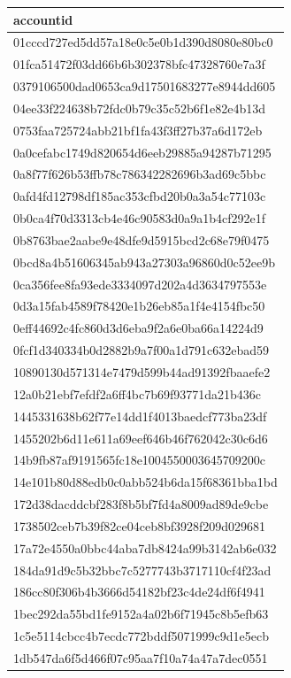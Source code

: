 \begin{tabular}{l}
\toprule
accountid \\
\midrule
01cccd727ed5dd57a18e0c5e0b1d390d8080e80bc0 \\
01fca51472f03dd66b6b302378bfc47328760e7a3f \\
0379106500dad0653ca9d17501683277e8944dd605 \\
04ee33f224638b72fdc0b79c35c52b6f1e82e4b13d \\
0753faa725724abb21bf1fa43f3ff27b37a6d172eb \\
0a0cefabc1749d820654d6eeb29885a94287b71295 \\
0a8f77f626b53ffb78c786342282696b3ad69c5bbc \\
0afd4fd12798df185ac353cfbd20b0a3a54c77103c \\
0b0ca4f70d3313cb4e46c90583d0a9a1b4cf292e1f \\
0b8763bae2aabe9e48dfe9d5915bcd2c68e79f0475 \\
0bcd8a4b51606345ab943a27303a96860d0c52ee9b \\
0ca356fee8fa93ede3334097d202a4d3634797553e \\
0d3a15fab4589f78420e1b26eb85a1f4e4154fbc50 \\
0eff44692c4fc860d3d6eba9f2a6e0ba66a14224d9 \\
0fcf1d340334b0d2882b9a7f00a1d791c632ebad59 \\
10890130d571314e7479d599b44ad91392fbaaefe2 \\
12a0b21ebf7efdf2a6ff4bc7b69f93771da21b436c \\
1445331638b62f77e14dd1f4013baedcf773ba23df \\
1455202b6d11e611a69eef646b46f762042c30c6d6 \\
14b9fb87af9191565fc18e1004550003645709200c \\
14e101b80d88edb0c0abb524b6da15f68361bba1bd \\
172d38dacddcbf283f8b5bf7fd4a8009ad89de9cbe \\
1738502ceb7b39f82ce04ceb8bf3928f209d029681 \\
17a72e4550a0bbc44aba7db8424a99b3142ab6e032 \\
184da91d9c5b32bbc7c5277743b3717110cf4f23ad \\
186cc80f306b4b3666d54182bf23c4de24df6f4941 \\
1bec292da55bd1fe9152a4a02b6f71945c8b5efb63 \\
1c5e5114cbcc4b7ecdc772bddf5071999c9d1e5ecb \\
1db547da6f5d466f07c95aa7f10a74a47a7dec0551 \\

\end{tabular}
